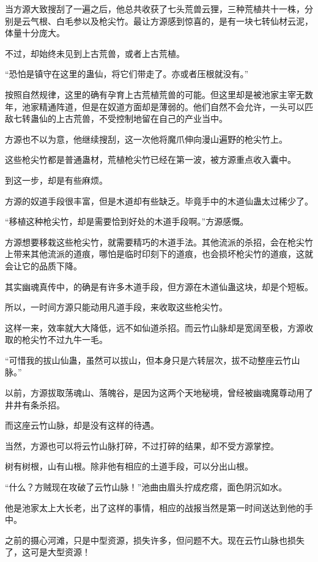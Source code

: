 \begin{this_body}
当方源大致搜刮了一遍之后，他总共收获了七头荒兽云狸，三种荒植共十一株，分别是云气根、白毛参以及枪尖竹。最让方源感到惊喜的，是有一块七转仙材云泥，体量十分庞大。

不过，却始终未见到上古荒兽，或者上古荒植。

“恐怕是镇守在这里的蛊仙，将它们带走了。亦或者压根就没有。”

按照自然规律，这里的确有孕育上古荒植荒兽的可能。但这里却是被池家主宰无数年，池家精通阵道，但是在奴道方面却是薄弱的。他们自然不会允许，一头可以匹敌七转蛊仙的上古荒兽，不受控制地留在自己的产业当中。

方源也不以为意，他继续搜刮，这一次他将魔爪伸向漫山遍野的枪尖竹上。

这些枪尖竹都是普通蛊材，荒植枪尖竹已经在第一波，被方源重点收入囊中。

到这一步，却是有些麻烦。

方源的奴道手段很丰富，但是木道却有些缺乏。毕竟手中的木道仙蛊太过稀少了。

“移植这种枪尖竹，却是需要恰到好处的木道手段啊。”方源感慨。

方源想要移栽这些枪尖竹，就需要精巧的木道手法。其他流派的杀招，会在枪尖竹上带来其他流派的道痕，哪怕是临时印刻下的道痕，也会损坏枪尖竹的道痕，这就会让它的品质下降。

其实幽魂真传中，的确是有许多木道手段，但方源在木道仙蛊这块，却是个短板。

所以，一时间方源只能动用凡道手段，来收取这些枪尖竹。

这样一来，效率就大大降低，远不如仙道杀招。而云竹山脉却是宽阔至极，方源收取的枪尖竹不过九牛一毛。

“可惜我的拔山仙蛊，虽然可以拔山，但本身只是六转层次，拔不动整座云竹山脉。”

以前，方源拔取荡魂山、落魄谷，是因为这两个天地秘境，曾经被幽魂魔尊动用了井井有条杀招。

而这座云竹山脉，却是没有这样的待遇。

当然，方源也可以将云竹山脉打碎，不过打碎的结果，却不受方源掌控。

树有树根，山有山根。除非他有相应的土道手段，可以分出山根。

“什么？方贼现在攻破了云竹山脉！”池曲由眉头拧成疙瘩，面色阴沉如水。

他是池家太上大长老，出了这样的事情，相应的战报当然是第一时间送达到他的手中。

之前的摄心河滩，只是中型资源，损失许多，但问题不大。现在云竹山脉也损失了，这可是大型资源！


\end{this_body}
